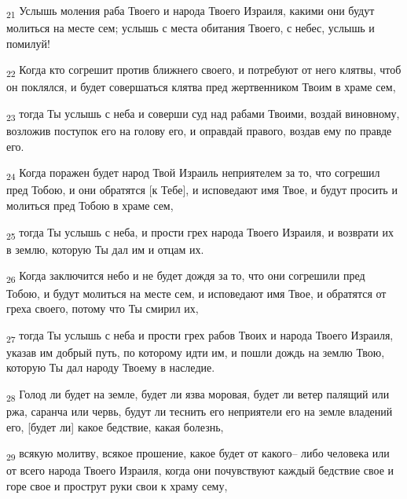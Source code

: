 \begin{tcolorbox}
\textsubscript{21} Услышь моления раба Твоего и народа Твоего Израиля, какими они будут молиться на месте сем; услышь с места обитания Твоего, с небес, услышь и помилуй!
\end{tcolorbox}
\begin{tcolorbox}
\textsubscript{22} Когда кто согрешит против ближнего своего, и потребуют от него клятвы, чтоб он поклялся, и будет совершаться клятва пред жертвенником Твоим в храме сем,
\end{tcolorbox}
\begin{tcolorbox}
\textsubscript{23} тогда Ты услышь с неба и соверши суд над рабами Твоими, воздай виновному, возложив поступок его на голову его, и оправдай правого, воздав ему по правде его.
\end{tcolorbox}
\begin{tcolorbox}
\textsubscript{24} Когда поражен будет народ Твой Израиль неприятелем за то, что согрешил пред Тобою, и они обратятся [к Тебе], и исповедают имя Твое, и будут просить и молиться пред Тобою в храме сем,
\end{tcolorbox}
\begin{tcolorbox}
\textsubscript{25} тогда Ты услышь с неба, и прости грех народа Твоего Израиля, и возврати их в землю, которую Ты дал им и отцам их.
\end{tcolorbox}
\begin{tcolorbox}
\textsubscript{26} Когда заключится небо и не будет дождя за то, что они согрешили пред Тобою, и будут молиться на месте сем, и исповедают имя Твое, и обратятся от греха своего, потому что Ты смирил их,
\end{tcolorbox}
\begin{tcolorbox}
\textsubscript{27} тогда Ты услышь с неба и прости грех рабов Твоих и народа Твоего Израиля, указав им добрый путь, по которому идти им, и пошли дождь на землю Твою, которую Ты дал народу Твоему в наследие.
\end{tcolorbox}
\begin{tcolorbox}
\textsubscript{28} Голод ли будет на земле, будет ли язва моровая, будет ли ветер палящий или ржа, саранча или червь, будут ли теснить его неприятели его на земле владений его, [будет ли] какое бедствие, какая болезнь,
\end{tcolorbox}
\begin{tcolorbox}
\textsubscript{29} всякую молитву, всякое прошение, какое будет от какого-- либо человека или от всего народа Твоего Израиля, когда они почувствуют каждый бедствие свое и горе свое и прострут руки свои к храму сему,
\end{tcolorbox}
